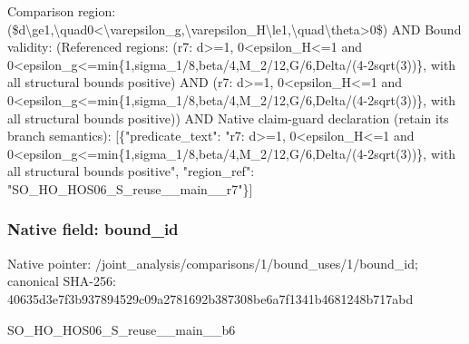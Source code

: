 \documentclass[10pt,a4paper]{article}
\begin{document}
\begingroup\raggedright\sloppy Comparison region:\allowbreak{} (\$d\textbackslash{}ge1,\allowbreak{}\textbackslash{}quad0<\textbackslash{}varepsilon\_\allowbreak{}g,\allowbreak{}\textbackslash{}varepsilon\_\allowbreak{}H\textbackslash{}le1,\allowbreak{}\textbackslash{}quad\textbackslash{}theta>0\$) AND Bound validity:\allowbreak{} (Referenced regions:\allowbreak{} (r7:\allowbreak{} d>=\allowbreak{}1,\allowbreak{} 0<epsilon\_\allowbreak{}H<=\allowbreak{}1 and 0<epsilon\_\allowbreak{}g<=\allowbreak{}min\{1,\allowbreak{}sigma\_\allowbreak{}1/\allowbreak{}8,\allowbreak{}beta/\allowbreak{}4,\allowbreak{}M\_\allowbreak{}2/\allowbreak{}12,\allowbreak{}G/\allowbreak{}6,\allowbreak{}Delta/\allowbreak{}(4-2sqrt(3))\},\allowbreak{} with all structural bounds positive) AND (r7:\allowbreak{} d>=\allowbreak{}1,\allowbreak{} 0<epsilon\_\allowbreak{}H<=\allowbreak{}1 and 0<epsilon\_\allowbreak{}g<=\allowbreak{}min\{1,\allowbreak{}sigma\_\allowbreak{}1/\allowbreak{}8,\allowbreak{}beta/\allowbreak{}4,\allowbreak{}M\_\allowbreak{}2/\allowbreak{}12,\allowbreak{}G/\allowbreak{}6,\allowbreak{}Delta/\allowbreak{}(4-2sqrt(3))\},\allowbreak{} with all structural bounds positive)) AND Native claim-guard declaration (retain its branch semantics):\allowbreak{} [\{"predicate\_\allowbreak{}text":\allowbreak{} "r7:\allowbreak{} d>=\allowbreak{}1,\allowbreak{} 0<epsilon\_\allowbreak{}H<=\allowbreak{}1 and 0<epsilon\_\allowbreak{}g<=\allowbreak{}min\{1,\allowbreak{}sigma\_\allowbreak{}1/\allowbreak{}8,\allowbreak{}beta/\allowbreak{}4,\allowbreak{}M\_\allowbreak{}2/\allowbreak{}12,\allowbreak{}G/\allowbreak{}6,\allowbreak{}Delta/\allowbreak{}(4-2sqrt(3))\},\allowbreak{} with all structural bounds positive",\allowbreak{} "region\_\allowbreak{}ref":\allowbreak{} "SO\_\allowbreak{}HO\_\allowbreak{}HOS06\_\allowbreak{}S\_\allowbreak{}reuse\_\allowbreak{}\_\allowbreak{}main\_\allowbreak{}\_\allowbreak{}r7"\}]\par\endgroup

\subsubsection{Native field: bound\_\allowbreak{}id}
Native pointer: /joint\_\allowbreak{}analysis/comparisons/1/bound\_\allowbreak{}uses/1/bound\_\allowbreak{}id; canonical SHA-256: 40635d3e7f3b937894529c09a2781692b387308be6a7f1341b4681248b717abd

\begingroup\raggedright\sloppy SO\_\allowbreak{}HO\_\allowbreak{}HOS06\_\allowbreak{}S\_\allowbreak{}reuse\_\allowbreak{}\_\allowbreak{}main\_\allowbreak{}\_\allowbreak{}b6\par\endgroup
\end{document}
